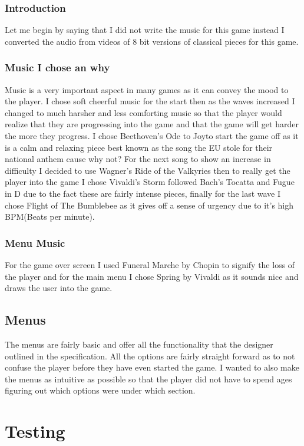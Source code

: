\documentclass{report}
\begin{document}
\subsection{Introduction}
Let me begin by saying that I did not write the music for this game instead I converted the audio from videos of 8 bit versions of classical pieces for this game. 
\subsection{Music I chose an why}
Music is a very important aspect in many games as it can convey the mood to the player.  I chose soft cheerful music for the start then as the waves increased I changed to much harsher and less comforting music so that the player would realize that they are progressing into the game and that the game will get harder the more they progress.  I chose Beethoven's Ode to Joy\cite{Beethoven}to start the game off as it is a calm and relaxing piece best known as the song the EU stole for their national anthem cause why not? For the next song to show an increase in difficulty I decided to use Wagner's Ride of the Valkyries\cite{Wagner} then to really get the player into the game I chose  Vivaldi's Storm\cite{Vivaldi} followed Bach's Tocatta and Fugue in D\cite{Bach} due to the fact these are fairly intense pieces, finally for the last wave I chose Flight of The Bumblebee as it gives off a sense of urgency due to it's high BPM(Beats per minute).
\subsection{Menu Music}
For the game over screen I used Funeral Marche by Chopin\cite{Chopin} to signify the loss of the player and for the main menu I chose Spring by Vivaldi\cite{Vivaldi2} as it sounds nice and draws the user into the game.
\section{Menus}
The menus are fairly basic and offer all the functionality that the designer outlined in the specification.  All the options are fairly straight forward as to not confuse the player before they have even started the game.  I wanted to also make the menus as intuitive as possible so that the player did not have to spend ages figuring out which options were under which section.
\chapter{Testing}
\end{document}
